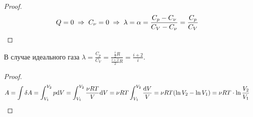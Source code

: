 \begin{proof}
	\[Q = 0 \;\Rightarrow\; C_\nu = 0 \;\Rightarrow\; \lambda = \alpha = \frac{C_p - C_\nu}{C_V - C_\nu} = \frac{C_p}{C_V}\]
\end{proof}
В случае идеального газа $\displaystyle \lambda = \frac{C_p}{C_V} = \frac{\frac{i}{2}R}{\frac{i + 2}{2}R} = \frac{i + 2}{i}$.

\begin{proof}
	\[A = \int \delta A = 
	\int_{V_1}^{V_2}{p \text{d} V} = 
	\int_{V_1}^{V_2}{\frac{\nu R T}{V} \text{d} V} =
	\nu R T \int_{V_1}^{V_2}{\frac{\text{d} V}{V}} = 
	\nu R T (\ln{V_2} - \ln{V_1}) = \nu R T \cdot \ln{\frac{V_2}{V_1}} \]
\end{proof}